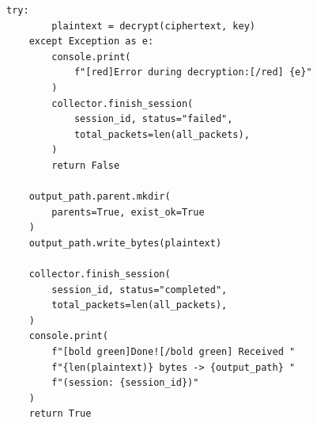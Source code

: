 \begin{lstlisting}[style=appendixcode]
    try:
        plaintext = decrypt(ciphertext, key)
    except Exception as e:
        console.print(
            f"[red]Error during decryption:[/red] {e}"
        )
        collector.finish_session(
            session_id, status="failed",
            total_packets=len(all_packets),
        )
        return False

    output_path.parent.mkdir(
        parents=True, exist_ok=True
    )
    output_path.write_bytes(plaintext)

    collector.finish_session(
        session_id, status="completed",
        total_packets=len(all_packets),
    )
    console.print(
        f"[bold green]Done![/bold green] Received "
        f"{len(plaintext)} bytes -> {output_path} "
        f"(session: {session_id})"
    )
    return True
\end{lstlisting}
